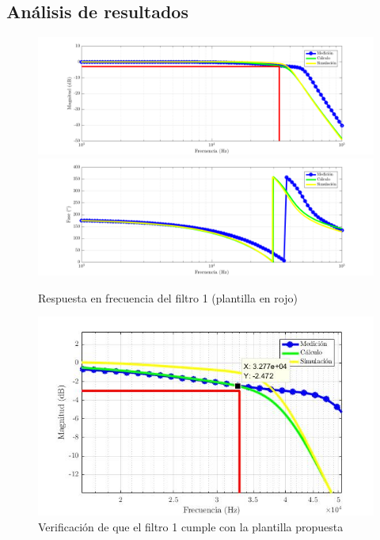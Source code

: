 \documentclass[../../tc_tp5_main.tex]{subfiles}
\begin{document}
\subsection{An\'alisis de resultados}

\begin{figure}[H]
	\centering
	\includegraphics[scale=0.7]{imagenes/tc_tp5_ej1_leg_mag.png}
	\includegraphics[scale=0.7]{imagenes/tc_tp5_ej1_leg_fase.png}
	\caption{Respuesta en frecuencia del filtro 1 (plantilla en rojo)}
\end{figure}

\begin{figure}[H]
	\centering
	\includegraphics[scale=0.5]{imagenes/leg_bandapasante.jpg}
	\caption{Verificaci\'on de que el filtro 1 cumple con la plantilla propuesta}
\end{figure}
\end{document}
